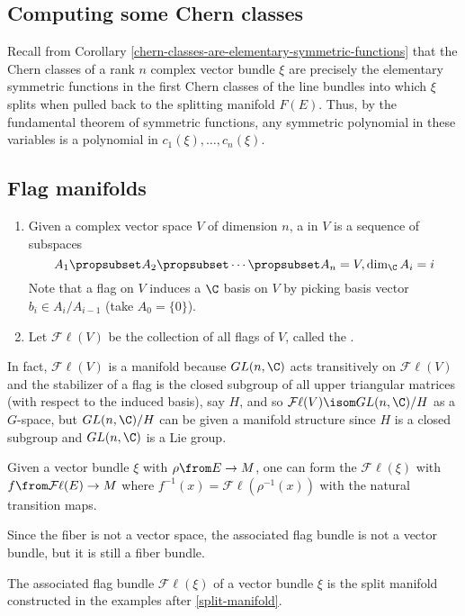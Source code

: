 \documentclass[11pt,leqno,oneside]{amsbook}
\numberwithin{thm}{section}
\newcommand{\Fl}{\mathcal{F\ell}}
\begin{document}
\subsection{Computing some Chern classes}
Recall from Corollary \ref{chern-classes-are-elementary-symmetric-functions}
that the Chern classes of a rank \(n\) complex 
vector bundle \(\xi\) are precisely the elementary symmetric functions in the
first Chern classes of the line bundles into which \(\xi\) splits when
pulled back to the splitting manifold \(F(E)\). Thus, by the
fundamental theorem of symmetric functions, any symmetric polynomial
in these variables is a polynomial in \(c_1(\xi), \ldots, c_n(\xi)\).
\subsection{Flag manifolds}
\begin{defn}
  \begin{enumerate}
  \item Given a complex vector space \(V\) of dimension \(n\), a
     in \(V\) is a sequence of subspaces
    \[ A_1 \propsubset A_2 \propsubset \cdots \propsubset A_n = V,
      \dim_\C A_i = i
    \]
    Note that a flag on \(V\) induces a \(\C\) basis on \(V\) by
    picking basis vector \(b_i \in A_{i}/A_{i-1}\) (take \(A_0 = \{0\}\)).
  \item Let \(\Fl(V)\) be the collection of all flags of \(V\), called
    the . 
  \end{enumerate}
\end{defn}
In fact, \(\Fl(V)\) is a manifold because \(GL(n,\C)\) acts
transitively on \(\Fl(V)\) and the stabilizer of a flag is the closed subgroup
of all upper triangular matrices (with respect to the induced basis),
say \(H\), and so \(\Fl(V) \isom GL(n,\C)/H\) as a \(G\)-space, but
\(GL(n,\C)/H\) can be given a manifold structure since \(H\) is a
closed subgroup and \(GL(n,\C)\) is a Lie group.
\begin{defn}
  Given a vector bundle \(\xi\) with \(\rho \from E \to M\), one can form the
   \(\Fl(\xi)\) with \(f \from \Fl(E) \to M\)
  where \(f^{-1}(x) = \Fl(\rho^{-1}(x))\) with the natural transition maps.
\end{defn}
Since the fiber is not a vector space, the associated flag bundle is
not a vector bundle, but it is still a fiber bundle.
\begin{prop}
  The associated flag bundle \(\Fl(\xi)\) of a vector bundle \(\xi\)
  is the split manifold constructed in the examples after
  \ref{split-manifold}. 
\end{prop}
\end{document}
